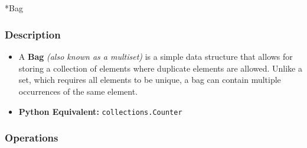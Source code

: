 \documentclass[
  letterpaper,
  DIV=11,
  numbers=noendperiod]{scrreprt}
\makeatletter
\let\oldsubparagraph\subparagraph
\renewcommand{\subparagraph}{
    \@ifstar
      \xxxSubParagraphStar
      \xxxSubParagraphNoStar
  }
\newcommand{\xxxSubParagraphStar}[1]{\oldsubparagraph*{#1}\mbox{}}
\newcommand{\xxxSubParagraphNoStar}[1]{\oldsubparagraph{#1}\mbox{}}
\providecommand{\tightlist}{%
  \setlength{\itemsep}{0pt}\setlength{\parskip}{0pt}}
\makeatother
\begin{document}
\subparagraph*{Bag}\label{bag}

\subsubsection{Description}

\begin{itemize}
\tightlist
\item
  A \textbf{Bag} \emph{(also known as a multiset)} is a simple data
  structure that allows for storing a collection of elements where
  duplicate elements are allowed. Unlike a set, which requires all
  elements to be unique, a bag can contain multiple occurrences of the
  same element.
\item
  \textbf{Python Equivalent:} \texttt{collections.Counter}
\end{itemize}

\subsubsection{Operations}
\end{document}
